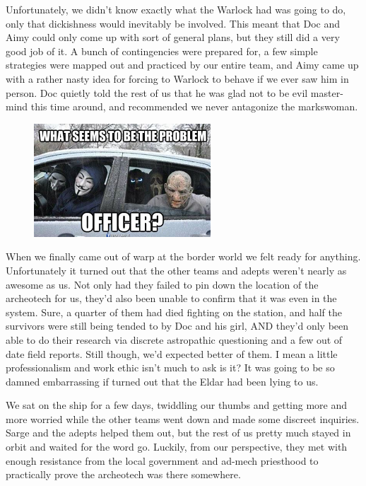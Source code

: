 Unfortunately, we didn't know exactly what the Warlock had was going to do, only that dickishness would inevitably be involved. 
This meant that Doc and Aimy could only come up with sort of general plans, but they still did a very good job of it. 
A bunch of contingencies were prepared for, a few simple strategies were mapped out and practiced by our entire team, and Aimy came up with a rather nasty idea for forcing to Warlock to behave if we ever saw him in person. 
Doc quietly told the rest of us that he was glad not to be evil master-mind this time around, and recommended we never antagonize the markswoman.

\begin{figure}
	\begin{center}
		\includegraphics[width=\figwidth]{pics/11/71.png}
	\end{center}
\end{figure}
When we finally came out of warp at the border world we felt ready for anything. 
Unfortunately it turned out that the other teams and adepts weren't nearly as awesome as us. 
Not only had they failed to pin down the location of the archeotech for us, they'd also been unable to confirm that it was even in the system. 
Sure, a quarter of them had died fighting on the station, and half the survivors were still being tended to by Doc and his girl, AND they'd only been able to do their research via discrete astropathic questioning and a few out of date field reports. 
Still though, we'd expected better of them. 
I mean a little professionalism and work ethic isn't much to ask is it? 
It was going to be so damned embarrassing if turned out that the Eldar had been lying to us.

We sat on the ship for a few days, twiddling our thumbs and getting more and more worried while the other teams went down and made some discreet inquiries. 
Sarge and the adepts helped them out, but the rest of us pretty much stayed in orbit and waited for the word go. 
Luckily, from our perspective, they met with enough resistance from the local government and ad-mech priesthood to practically prove the archeotech was there somewhere. 


